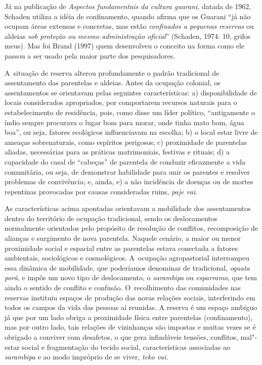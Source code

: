 Já na publicação de \emph{Aspectos fundamentais da cultura guarani}, datada de
1962, Schaden utiliza a idéia de confinamento, quando afirma que os
Guarani ``já não ocupam áreas extensas e concretas, mas estão \emph{confinados
a pequenas reservas} ou aldeias \emph{sob proteção ou mesmo administração
oficial}'' (Schaden, 1974: 10, grifos meus). Mas foi Brand (1997) quem
desenvolveu o conceito na forma como ele passou a ser usado pela maior
parte dos pesquisadores.

A~situação de reserva alterou profundamente o padrão tradicional de
assentamento das parentelas e aldeias. Antes da ocupação colonial, os
assentamentos se orientavam pelas seguintes características: a)
disponibilidade de locais considerados apropriados, por comportarem
recursos naturais para o estabelecimento de residência, pois, como
disse um líder político, ``antigamente o índio sempre procurava o lugar
bom para morar, onde tinha mato bom, água boa'', ou seja, fatores
ecológicos influenciavam na escolha; b) o local estar livre de ameaças
sobrenaturais, como espíritos perigosos; c) proximidade de parentelas
aliadas, necessárias para as práticas matrimoniais, festivas e rituais;
d) a capacidade do casal de ``cabeças'' de parentela de conduzir
eficazmente a vida comunitária, ou seja, de demonstrar habilidade para
unir os parentes e resolver problemas de convivência; e, ainda, e) a
não incidência de doenças ou de mortes repentinas provocadas por causas
consideradas ruins, \emph{paje vai}.

As características acima apontadas orientavam a mobilidade dos
assentamentos dentro do território de ocupação tradicional, sendo os
deslocamentos normalmente orientados pelo propósito de resolução de
conflitos, recomposição de alianças e surgimento de nova parentela.
Naquele cenário, a maior ou menor proximidade social e espacial entre
as parentelas estava conectada a fatores ambientais, sociológicos e
cosmológicos. A~ocupação agropastorial interrompeu essa dinâmica de
mobilidade, que poderíamos denominar de tradicional, \emph{oguata porã}, e
impôs um novo tipo de deslocamento, o \emph{sarambipa} ou \emph{esparramo}, que tem
ainda o sentido de conflito e confusão. O~recolhimento das comunidades
nas reservas instituiu espaços de produção das novas relações sociais,
interferindo em todos os campos da vida das pessoas aí reunidas. A
reserva é um espaço ambíguo já que por um lado obriga a proximidade
física entre parentelas (confinamento), mas por outro lado, tais
relações de vizinhanças são impostas e muitas vezes se é obrigado a
conviver com desafetos, o que gera infindáveis tensões, conflitos,
mal"-estar social e fragmentação do tecido social, características
associadas ao \emph{sarambipa} e ao modo impróprio de se viver, \emph{teko vai}.

